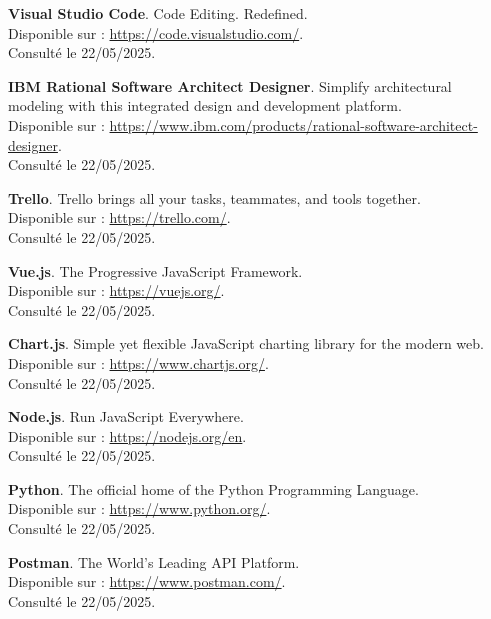 \documentclass[a4paper,11pt]{report}
\begin{document}
\begin{enumerate}[label=\textbf{[\arabic*]}, leftmargin=1.5cm, itemsep=1.5em]

\item \textbf{Visual Studio Code}. Code Editing. Redefined. \\
Disponible sur : \url{https://code.visualstudio.com/}. \\
Consulté le 22/05/2025.

\item \textbf{IBM Rational Software Architect Designer}. Simplify architectural modeling with this integrated design and development platform. \\
Disponible sur : \url{https://www.ibm.com/products/rational-software-architect-designer}. \\
Consulté le 22/05/2025.

\item \textbf{Trello}. Trello brings all your tasks, teammates, and tools together. \\
Disponible sur : \url{https://trello.com/}. \\
Consulté le 22/05/2025.

\item \textbf{Vue.js}. The Progressive JavaScript Framework. \\
Disponible sur : \url{https://vuejs.org/}. \\
Consulté le 22/05/2025.

\item \textbf{Chart.js}. Simple yet flexible JavaScript charting library for the modern web. \\
Disponible sur : \url{https://www.chartjs.org/}. \\
Consulté le 22/05/2025.

\item \textbf{Node.js}. Run JavaScript Everywhere. \\
Disponible sur : \url{https://nodejs.org/en}. \\
Consulté le 22/05/2025.

\item \textbf{Python}. The official home of the Python Programming Language. \\
Disponible sur : \url{https://www.python.org/}. \\
Consulté le 22/05/2025.

\item \textbf{Postman}. The World's Leading API Platform. \\
Disponible sur : \url{https://www.postman.com/}. \\
Consulté le 22/05/2025.


\end{enumerate}
\end{document}

